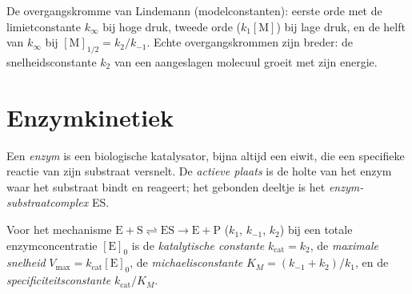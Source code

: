 \begin{omfigure}

{\small De overgangskromme van Lindemann (modelconstanten): eerste orde met
de limietconstante $k_\infty$ bij hoge druk, tweede orde ($k_1[\mathrm M]$)
bij lage druk, en de helft van $k_\infty$ bij $[\mathrm M]_{1/2} = k_2/k_{-1}$.
Echte overgangskrommen zijn breder: de snelheidsconstante $k_2$ van een
aangeslagen molecuul groeit met zijn energie.}
\end{omfigure}

\section{Enzymkinetiek}

\begin{definition}\label{def:b3:complex-kinetics:enzyme}
Een \emph{enzym} is een biologische katalysator, bijna altijd
een eiwit, die een specifieke reactie van zijn substraat versnelt. De
\emph{actieve plaats} is de holte van het enzym waar
het substraat bindt en reageert; het gebonden deeltje is het
\emph{enzym-substraatcomplex} ES.
\end{definition}

\begin{definition}\label{def:b3:complex-kinetics:michaelis}
Voor het mechanisme $\mathrm{E + S \rightleftharpoons ES \to E + P}$ ($k_1$, $k_{-1}$, $k_2$) bij een totale enzymconcentratie
$[\mathrm E]_0$ is de
\emph{katalytische constante} $k_{\mathrm{cat}} = k_2$, de
\emph{maximale snelheid} $V_{\max} = k_{\mathrm{cat}}[\mathrm E]_0$, de
\emph{michaelisconstante}
 $K_M = (k_{-1} + k_2)/k_1$, en de
\emph{specificiteitsconstante}
 $k_{\mathrm{cat}}/K_M$.
\end{definition}

